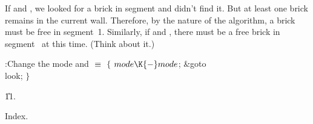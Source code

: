 If  and , we looked for a brick in
segment 
and didn't find it. But at least one brick remains in the current
wall. Therefore, by the nature of the algorithm, a brick must
be free in segment~1. Similarly, if  and , there
must be a free brick in segment~ at this time. (Think about it.)

\Y\B\4:Change the mode and \X${}\equiv{}$\6
${}\{{}$\1\6
${}\\{mode}\K{-}\\{mode}{}$;\5
\&{goto} \\{look};\6
\4${}\}{}$\2\par
\U11.\fi

Index.
\fi

\inx
\fin
\con
